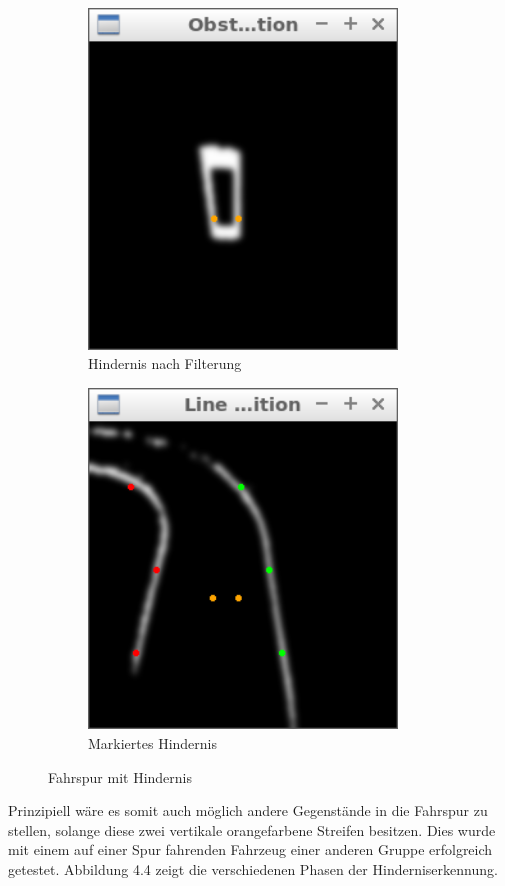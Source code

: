 \begin{figure}[h]
\begin{subfigure}{0.45\textwidth}
		\includegraphics[width=0.9\textwidth]{images/obstacle_alone_bw.png}
		\caption{Hindernis nach Filterung}
	\end{subfigure}
	\begin{subfigure}{0.45\textwidth}
		\centering
		\includegraphics[width=0.9\textwidth]{images/obstacle_bw.png}
		\caption{Markiertes Hindernis}
	\end{subfigure}
	\caption{Fahrspur mit Hindernis}
	\label{Bild von Hindernis}
\end{figure}
Prinzipiell wäre es somit auch möglich andere Gegenstände in die Fahrspur zu stellen, solange diese zwei vertikale orangefarbene Streifen besitzen. Dies wurde mit einem auf einer Spur fahrenden Fahrzeug einer anderen Gruppe erfolgreich getestet. Abbildung 4.4 zeigt die verschiedenen Phasen der Hinderniserkennung.
